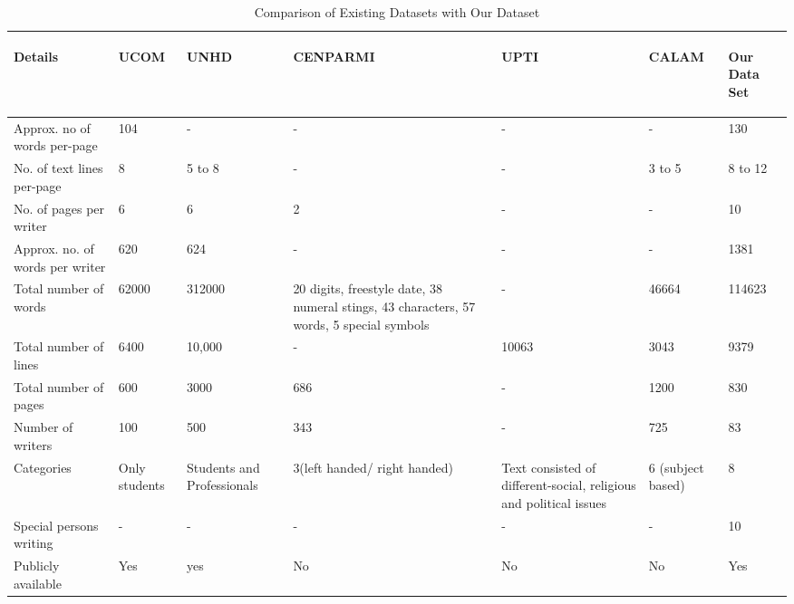 \begin{table}[t]
\centering
\caption{Comparison of Existing Datasets with Our Dataset}\label{tabdataset}
\begin{tabular}{|p{1.2cm}|p{0.6cm}|p{0.6cm}|p{1.5cm}|p{0.5cm}|p{0.7cm}|p{0.5cm}|}
\hline
\begin{flushleft}
\textbf{Details	}
\end{flushleft}& \begin{flushleft}
\textbf{UCOM}
\end{flushleft} & \begin{flushleft}
\textbf{UNHD}
\end{flushleft} & \begin{flushleft}
\textbf{CENPARMI}
\end{flushleft} & \begin{flushleft}
\textbf{UPTI}	
\end{flushleft}& \begin{flushleft}
\textbf{CALAM}
\end{flushleft} &	\begin{flushleft}
\textbf{Our Data Set}
\end{flushleft} \\ \hline
Approx. no of words per-page &	104	& - & - & - &	-&	130 \\ \hline
No. of text lines per-page	& 8	& 5 to 8 & - & - &	3 to 5	& 8 to 12 \\ \hline
No. of pages per writer	&6&	6&	2& - & -&			10 \\ \hline
Approx. no. of words per writer &	620	& 624& -&-&-&				1381 \\ \hline
Total number of words	& 62000	&312000	&20 digits, freestyle date, 38 numeral stings, 43 characters, 57 words, 5 special symbols		& -& 46664	& 114623 \\ \hline
Total number of lines &	6400 &	10,000&-&		10063	&3043&	9379 \\ \hline

Total number of pages&	600	&3000&	686	&-&	1200&	830 \\ \hline

Number of writers	& 100&	500	&343&-&		725&	83 \\ \hline

Categories&	Only students&	Students and Professionals &	3(left handed/ right handed)&	Text consisted of different-social, religious and political issues	&6 (subject based)&	8 \\ \hline
Special persons writing	& - & - & - & - & - &			10 \\ \hline

Publicly available	& Yes	&yes&	No&	No&	No&	Yes \\ \hline


\hline
 \end{tabular}
\end{table}

